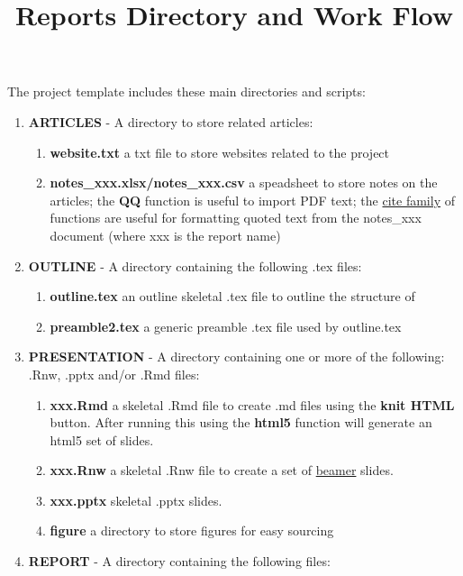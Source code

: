\documentclass{article}\usepackage{graphicx, color}
\begin{document}
\title{Reports Directory and Work Flow}
\author{}
\date{}
\maketitle

\vspace{-1cm}
The project template includes these main directories and scripts:

\begin{enumerate}
  \item \textbf{ARTICLES} - A directory to store related articles:
  \begin{enumerate}
    \item \textbf{website.txt} a txt file to store websites related to the project
    \item \textbf{notes\_xxx.xlsx/notes\_xxx.csv} a speadsheet to store notes on the articles; the \textbf{QQ} function is useful to import PDF text; the \href{http://trinker.github.io/reports/cite.html}{cite family} of functions are useful for formatting quoted text from the notes\_xxx document (where xxx is the report name)
  \end{enumerate}
  \item \textbf{OUTLINE} - A directory containing the following .tex files:
  \begin{enumerate}
    \item \textbf{outline.tex} an outline skeletal .tex file to outline the structure of  
    \item \textbf{preamble2.tex} a generic preamble .tex file used by outline.tex  
  \end{enumerate}  
  \item \textbf{PRESENTATION} - A directory containing one or more of the following: .Rnw, .pptx and/or .Rmd files:
  \begin{enumerate}
    \item \textbf{xxx.Rmd} a skeletal .Rmd file to create .md files using the \textbf{knit HTML} button.  After running this using the \textbf{html5} function will generate an html5 set of slides.
    \item \textbf{xxx.Rnw} a skeletal .Rnw file to create a set of \href{http://www.math.umbc.edu/~rouben/beamer/}{beamer} slides.  
    \item \textbf{xxx.pptx}  skeletal .pptx slides.      
     \item \textbf{figure} a directory to store figures for easy sourcing
  \end{enumerate} 
  \item \textbf{REPORT} - A directory containing the following files:

\end{enumerate}
\end{document}
